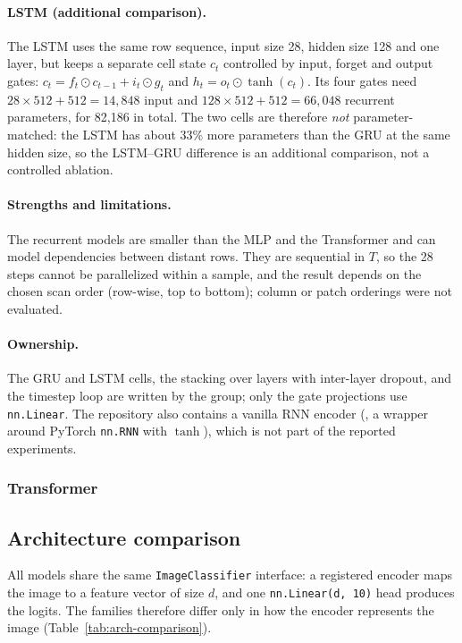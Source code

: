\paragraph{LSTM (additional comparison).} The LSTM uses the same row sequence,
input size 28, hidden size 128 and one layer, but keeps a separate cell state
$c_t$ controlled by input, forget and output gates:
$c_t=f_t\odot c_{t-1}+i_t\odot g_t$ and $h_t=o_t\odot\tanh(c_t)$. Its four
gates need $28\times512+512=14{,}848$ input and $128\times512+512=66{,}048$
recurrent parameters, for 82,186 in total. The two cells are therefore
\emph{not} parameter-matched: the LSTM has about 33\% more parameters than the
GRU at the same hidden size, so the LSTM--GRU difference is an additional
comparison, not a controlled ablation.

\paragraph{Strengths and limitations.} The recurrent models are smaller than the
MLP and the Transformer and can model dependencies between distant rows. They
are sequential in $T$, so the 28 steps cannot be parallelized within a sample,
and the result depends on the chosen scan order (row-wise, top to bottom);
column or patch orderings were not evaluated.

\paragraph{Ownership.} The GRU and LSTM cells, the stacking over layers with
inter-layer dropout, and the timestep loop are written by the group; only the
gate projections use \texttt{nn.Linear}. The repository also contains a
vanilla RNN encoder (, a wrapper around PyTorch
\texttt{nn.RNN} with $\tanh$), which is not part of the reported experiments.

\subsubsection{Transformer}

\subsection{Architecture comparison}
\label{sec:architecture-comparison}
All models share the same \texttt{ImageClassifier} interface: a registered
encoder maps the image to a feature vector of size $d$, and one
\texttt{nn.Linear(d, 10)} head produces the logits. The families therefore
differ only in how the encoder represents the image (Table~\ref{tab:arch-comparison}).


